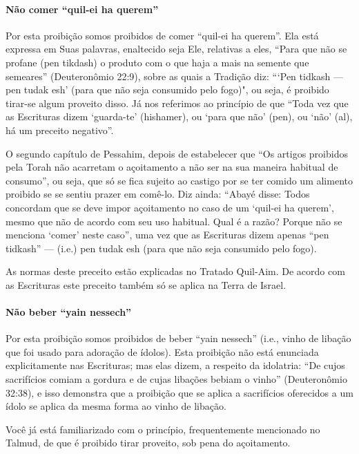 \paragraph{Não comer ``quil-ei ha querem''}

Por esta proibição somos proibidos de comer ``quil-ei ha querem''. Ela
está expressa em Suas palavras, enaltecido seja Ele, relativas a eles,
``Para que não se profane (pen tikdash) o produto com o que haja a mais
na semente que semeares'' (Deuteronômio 22:9), sobre as quais a Tradição
diz: ```Pen tidkash --- pen tudak esh' (para que não seja consumido
pelo fogo)", ou seja, é proibido tirar-se algum proveito disso. Já nos
referimos ao princípio de que ``Toda vez que as Escrituras dizem
`guarda-te' (hishamer), ou `para que não' (pen), ou `não' (al), há um
preceito negativo''.

O segundo capítulo de Pessahim, depois de estabelecer que ``Os artigos
proibidos pela Torah não acarretam o açoitamento a não ser na sua
maneira habitual de consumo'', ou seja, que só se fica sujeito ao
castigo por se ter comido um alimento proibido se se sentiu prazer em
comê-lo. Diz ainda: ``Abayé disse: Todos concordam que se deve impor
açoitamento no caso de um `quil-ei ha querem', mesmo que não de acordo
com seu uso habitual. Qual é a razão? Porque não se menciona `comer'
neste caso'', uma vez que as Escrituras dizem apenas ``pen tidkash''
--- (i.e.) pen tudak esh (para que não seja consumido pelo fogo).

As normas deste preceito estão explicadas no Tratado Quil-Aim. De acordo
com as Escrituras este preceito também só se aplica na Terra de Israel.

\paragraph{Não beber ``yain nessech''}

Por esta proibição somos proibidos de beber ``yain nessech'' (i.e.,
vinho de libação que foi usado para adoração de ídolos). Esta proibição
não está enunciada explicitamente nas Escrituras; mas elas dizem, a
respeito da idolatria: ``De cujos sacrifícios comiam a gordura e de
cujas libações bebiam o vinho'' (Deuteronômio 32:38), e isso demonstra
que a proibição que se aplica a sacrifícios oferecidos a um ídolo se
aplica da mesma forma ao vinho de libação.

Você já está familiarizado com o princípio, frequentemente mencionado
no Talmud, de que é proibido tirar proveito, sob pena do açoitamento.

